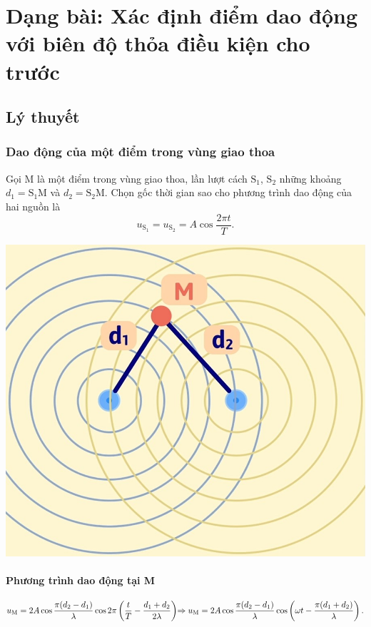 
\chapter[Dạng bài: Xác định điểm dao động với biên độ thỏa điều kiện cho trước]{Dạng bài: Xác định điểm dao động với biên độ thỏa điều kiện cho trước}
\section{Lý thuyết}
\subsection{Dao động của một điểm trong vùng giao thoa}

Gọi M là một điểm trong vùng giao thoa, lần lượt cách $\text{S}_1$, $\text{S}_2$ những khoảng $d_1=\text{S}_1\text{M}$ và $d_2=\text{S}_2\text{M}$. Chọn gốc thời gian sao cho phương trình dao động của hai nguồn là
\begin{equation*}
	u_{\text{S}_1}=u_{\text{S}_2}=A\cos\dfrac{2\pi t}{T}.
\end{equation*}
\begin{center}
	\includegraphics[scale=0.3]{../figs/VN12-PH-11-A-007-1-V2-0.JPG}
\end{center}
\subsubsection{Phương trình dao động tại M}
\begin{equation*}
	u_{\text{M}}=2A\cos\dfrac{\pi(d_2-d_1)}{\lambda}\cos 2\pi \left(\dfrac{t}{T}-\dfrac{d_1+d_2}{2\lambda}\right)$$
	$$\Rightarrow u_{\text{M}}=2A\cos\dfrac{\pi(d_2-d_1)}{\lambda}\cos \left(\omega t-\dfrac{\pi (d_1+d_2)}{\lambda}\right).
\end{equation*}

